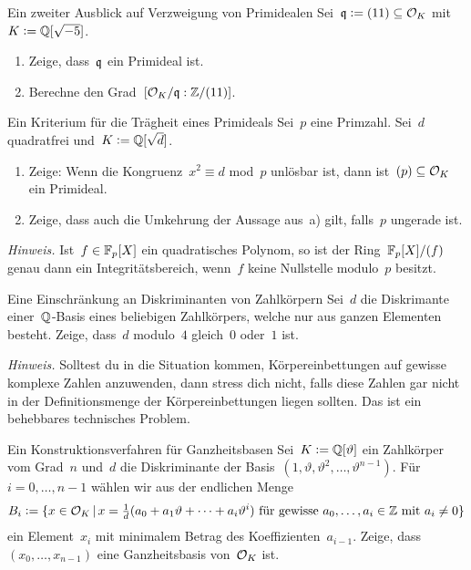\documentclass{uebblatt}
\begin{document}

\begin{aufgabe}{Ein zweiter Ausblick auf Verzweigung von Primidealen}
Sei~$\mathfrak{q} \vcentcolon= (11) \subseteq \mathcal{O}_K$ mit~$K \vcentcolon= \mathbb{Q}[\sqrt{-5}]$.
\begin{multicols}{2}
\begin{enumerate}
\item Zeige, dass~$\mathfrak{q}$ ein Primideal ist.
\item Berechne den Grad~$[\mathcal{O}_K/\mathfrak{q} : \mathbb{Z}/(11)]$.
\end{enumerate}
\end{multicols}
\vspace{-1em}
\end{aufgabe}

\begin{aufgabe}{Ein Kriterium für die Trägheit eines Primideals}
Sei~$p$ eine Primzahl. Sei~$d$ quadratfrei und~$K \vcentcolon= \mathbb{Q}[\sqrt{d}]$.
\begin{enumerate}
\item Zeige: Wenn die Kongruenz~$x^2 \equiv d$ mod~$p$ unlösbar ist,
dann ist~$(p) \subseteq \mathcal{O}_K$ ein Primideal.
\item Zeige, dass auch die Umkehrung der Aussage aus~a) gilt, falls~$p$
ungerade ist.
\end{enumerate}
{\tiny\emph{Hinweis.} Ist~$f \in \mathbb{F}_p[X]$ ein quadratisches Polynom, so ist
der Ring~$\mathbb{F}_p[X]/(f)$ genau dann ein Integritätsbereich, wenn~$f$ keine
Nullstelle modulo~$p$ besitzt.\par}
\end{aufgabe}

\begin{aufgabe}{Eine Einschränkung an Diskriminanten von Zahlkörpern}
Sei~$d$ die Diskrimante einer~$\mathbb{Q}$-Basis eines beliebigen Zahlkörpers, welche
nur aus ganzen Elementen besteht. Zeige, dass~$d$ modulo~$4$ gleich~$0$ oder~$1$ ist.

{\tiny\emph{Hinweis.} Solltest du in die Situation kommen, Körpereinbettungen
auf gewisse komplexe Zahlen anzuwenden, dann stress dich nicht, falls diese
Zahlen gar nicht in der Definitionsmenge der Körpereinbettungen liegen sollten.
Das ist ein behebbares technisches Problem.\par}
\end{aufgabe}

\begin{aufgabe}{Ein Konstruktionsverfahren für Ganzheitsbasen}
Sei~$K \vcentcolon= \mathbb{Q}[\vartheta]$ ein Zahlkörper vom Grad~$n$ und~$d$ die
Diskriminante der Basis~$(1,\vartheta,\vartheta^2,\ldots,\vartheta^{n-1})$.
Für~$i = 0, \ldots, {n-1}$ wählen wir aus der endlichen Menge
\[ B_i \vcentcolon= \{ x \in \mathcal{O}_K \,|\,
  \text{$x = \tfrac{1}{d}(a_0 + a_1\vartheta + \cdots +
  a_i\vartheta^i)$ für gewisse~$a_0,\ldots,a_i \in \mathbb{Z}$ mit~$a_i
  \neq 0$} \} \]
ein Element~$x_i$ mit minimalem Betrag des Koeffizienten~$a_{i-1}$. Zeige,
dass~$(x_0,\ldots,x_{n-1})$ eine Ganzheitsbasis von~$\mathcal{O}_K$ ist.
\end{aufgabe}
\end{document}

